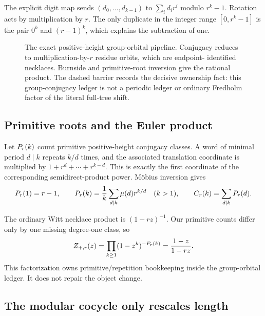 The explicit digit map sends $(d_0,\ldots,d_{k-1})$ to
$\sum_i d_ir^i$ modulo $r^k-1$.  Rotation acts by multiplication by $r$.
The only duplicate in the integer range $[0,r^k-1]$ is the pair
$0^k$ and $(r-1)^k$, which explains the subtraction of one.

\begin{figure}[t]
  \centering
  \resizebox{0.99\textwidth}{!}{}
  \caption{The exact positive-height group-orbital pipeline.  Conjugacy
  reduces to multiplication-by-$r$ residue orbits, which are endpoint-
  identified necklaces.  Burnside and primitive-root inversion give the
  rational product.  The dashed barrier records the decisive ownership fact:
  this group-conjugacy ledger is not a periodic ledger or ordinary Fredholm
  factor of the literal full-tree shift.}
  \label{fig:orbital-necklace}
\end{figure}

\subsection{Primitive roots and the Euler product}

Let $P_r(k)$ count primitive positive-height conjugacy classes.  A word of
minimal period $d\mid k$ repeats $k/d$ times, and the associated translation
coordinate is multiplied by
$1+r^d+\cdots+r^{k-d}$.  This is exactly the first coordinate of the
corresponding semidirect-product power.  M\"obius inversion gives
\begin{equation}
  P_r(1)=r-1,
  \qquad
  P_r(k)=\frac1k\sum_{d\mid k}\mu(d)r^{k/d}\quad(k>1),
  \qquad
  C_r(k)=\sum_{d\mid k}P_r(d).
  \label{eq:primitive-count}
\end{equation}

The ordinary Witt necklace product is $(1-rz)^{-1}$.  Our primitive counts
differ only by one missing degree-one class, so
\begin{equation}
  Z_{+,r}(z)
  =\prod_{k\ge1}(1-z^k)^{-P_r(k)}
  =\frac{1-z}{1-rz}.
  \label{eq:orbital-product}
\end{equation}
This factorization owns primitive/repetition bookkeeping inside the
group-orbital ledger.  It does not repair the object change.

\subsection{The modular cocycle only rescales length}

